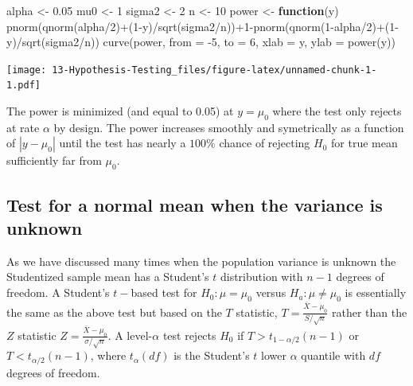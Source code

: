 \documentclass[
]{book}
\newenvironment{Shaded}{\begin{snugshade}}{\end{snugshade}}
\newcommand{\AttributeTok}[1]{\textcolor[rgb]{0.77,0.63,0.00}{#1}}
\newcommand{\ControlFlowTok}[1]{\textcolor[rgb]{0.13,0.29,0.53}{\textbf{#1}}}
\newcommand{\DecValTok}[1]{\textcolor[rgb]{0.00,0.00,0.81}{#1}}
\newcommand{\FloatTok}[1]{\textcolor[rgb]{0.00,0.00,0.81}{#1}}
\newcommand{\FunctionTok}[1]{\textcolor[rgb]{0.00,0.00,0.00}{#1}}
\newcommand{\NormalTok}[1]{#1}
\newcommand{\OtherTok}[1]{\textcolor[rgb]{0.56,0.35,0.01}{#1}}
\newcommand{\SpecialCharTok}[1]{\textcolor[rgb]{0.00,0.00,0.00}{#1}}
\newcommand{\StringTok}[1]{\textcolor[rgb]{0.31,0.60,0.02}{#1}}
\begin{document}
\begin{Shaded}
\begin{Highlighting}[]
\NormalTok{alpha }\OtherTok{\textless{}{-}} \FloatTok{0.05}
\NormalTok{mu0 }\OtherTok{\textless{}{-}} \DecValTok{1}
\NormalTok{sigma2 }\OtherTok{\textless{}{-}} \DecValTok{2}
\NormalTok{n }\OtherTok{\textless{}{-}} \DecValTok{10}
\NormalTok{power }\OtherTok{\textless{}{-}} \ControlFlowTok{function}\NormalTok{(y) }\FunctionTok{pnorm}\NormalTok{(}\FunctionTok{qnorm}\NormalTok{(alpha}\SpecialCharTok{/}\DecValTok{2}\NormalTok{)}\SpecialCharTok{+}\NormalTok{(}\DecValTok{1}\SpecialCharTok{{-}}\NormalTok{y)}\SpecialCharTok{/}\FunctionTok{sqrt}\NormalTok{(sigma2}\SpecialCharTok{/}\NormalTok{n))}\SpecialCharTok{+}\DecValTok{1}\SpecialCharTok{{-}}\FunctionTok{pnorm}\NormalTok{(}\FunctionTok{qnorm}\NormalTok{(}\DecValTok{1}\SpecialCharTok{{-}}\NormalTok{alpha}\SpecialCharTok{/}\DecValTok{2}\NormalTok{)}\SpecialCharTok{+}\NormalTok{(}\DecValTok{1}\SpecialCharTok{{-}}\NormalTok{y)}\SpecialCharTok{/}\FunctionTok{sqrt}\NormalTok{(sigma2}\SpecialCharTok{/}\NormalTok{n))}
\FunctionTok{curve}\NormalTok{(power, }\AttributeTok{from =} \SpecialCharTok{{-}}\DecValTok{5}\NormalTok{, }\AttributeTok{to =} \DecValTok{6}\NormalTok{, }\AttributeTok{xlab =} \StringTok{\textquotesingle{}y\textquotesingle{}}\NormalTok{, }\AttributeTok{ylab =} \StringTok{\textquotesingle{}power(y)\textquotesingle{}}\NormalTok{)  }
\end{Highlighting}
\end{Shaded}

\texttt{[image: 13-Hypothesis-Testing\_files/figure-latex/unnamed-chunk-1-1.pdf]}

The power is minimized (and equal to 0.05) at \(y = \mu_0\) where the test only rejects at rate \(\alpha\) by design. The power increases smoothly and symetrically as a function of \(|y-\mu_0|\) until the test has nearly a \(100\%\) chance of rejecting \(H_0\) for true mean sufficiently far from \(\mu_0\).

\hypertarget{test-for-a-normal-mean-when-the-variance-is-unknown}{%
\subsection{Test for a normal mean when the variance is unknown}\label{test-for-a-normal-mean-when-the-variance-is-unknown}}

As we have discussed many times when the population variance is unknown the Studentized sample mean has a Student's \(t\) distribution with \(n-1\) degrees of freedom. A Student's \(t-\)based test for \(H_0:\mu = \mu_0\) versus \(H_a:\mu\ne\mu_0\) is essentially the same as the above test but based on the \(T\) statistic, \(T = \frac{\overline X - \mu_0}{S/\sqrt{n}}\) rather than the \(Z\) statistic \(Z = \frac{\overline X - \mu_0}{\sigma/\sqrt{n}}\). A level-\(\alpha\) test rejects \(H_0\) if \(T > t_{1-\alpha/2}(n-1)\) or \(T < t_{\alpha/2}(n-1)\), where \(t_\alpha(df)\) is the Student's \(t\) lower \(\alpha\) quantile with \(df\) degrees of freedom.
\end{document}
